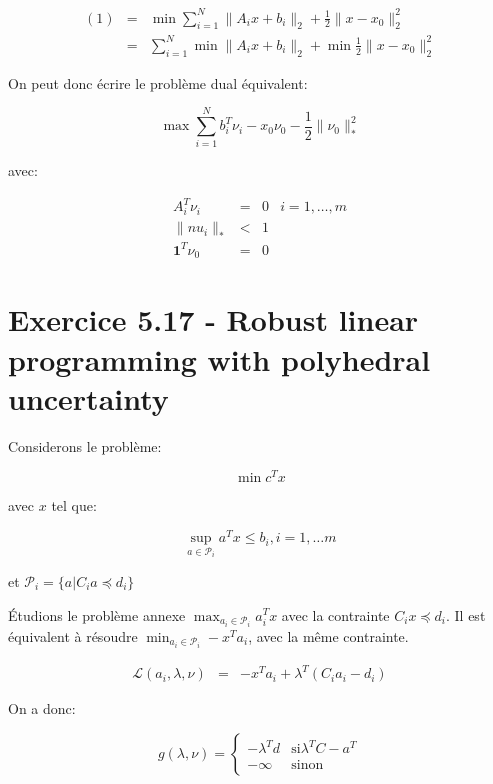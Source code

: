 \documentclass{article}
\begin{document}
\begin{align*}
(1) & = & \min \sum_{i = 1}^N \| A_i x + b_i \|_2 + \frac{1}{2} \| x - x_0
\|_2^2\\
    & = & \sum_{i = 1}^ N \min \| A_i x + b_i \|_2 + \min \frac {1}{2} \| x -
    x_0  \|_2^2
\end{align*}

On peut donc écrire le problème dual équivalent:

\begin{equation*}
\max \sum_{i = 1}^N b_i^T \nu_i - x_0 \nu_0 - \frac{1}{2} \| \nu_0\|_*^2
\end{equation*}

avec:

\begin{align*}
A_i^T \nu_i & = & 0 & i=1, \dots, m \\
\| nu_i \|_* & < & 1 & \\
\mathbf{1}^T \nu_0 & = & 0 &
\end{align*}

\section{Exercice 5.17 - Robust linear programming with polyhedral uncertainty}

Considerons le problème:

\begin{equation}
\label{pbm_517}
\min c^Tx
\end{equation}

avec $x$ tel que:

\begin{equation*}
\sup_{a \in \mathcal{P}_i} a^Tx \leq b_i, i = 1, \dots m
\end{equation*}

et $\mathcal{P}_i =  \{a | C_ia \preceq  d_i \}$

Étudions le problème annexe $\max_{a_i \in \mathcal{P}_i} a_i^T x$ avec la
contrainte $C_i x \preceq d_i$.
Il est équivalent à résoudre $\min_{a_i \in \mathcal{P}_i} - x^T a_i$, avec la
même contrainte.

\begin{align*}
\mathcal{L}(a_i, \lambda, \nu) & = & -x^T a_i + \lambda^T(C_i a_i - d_i)
\end{align*}

On a donc:

\begin{equation*}
g(\lambda, \nu) = \begin{cases}
		    - \lambda^T d & \mbox{si} \lambda^T C - a^T \\
		    - \infty & \mbox{sinon}
		  \end{cases}
\end{equation*}
\end{document}
